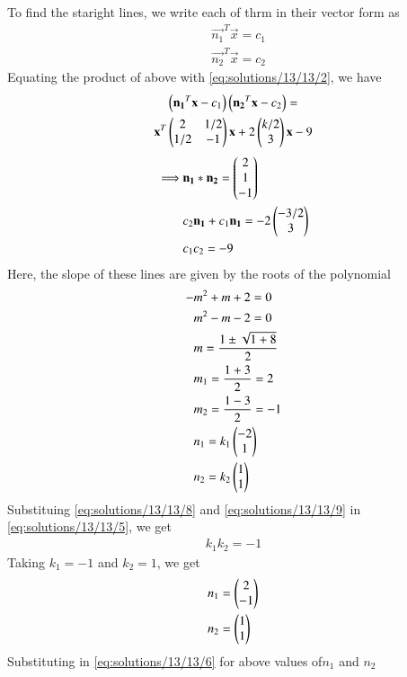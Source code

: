 To find the staright lines, we write each of thrm in their vector form as
\begin{align}
	& \vec{n_1}^T\vec{x} =c_1 \\
	& \vec{n_2}^T\vec{x} =c_2 
\end{align} 
Equating the product of above with \eqref{eq:solutions/13/13/2}, we have
\begin{multline}
 \left(\mathbf{n_1}^T\mathbf{x}-c_1\right)\left(\mathbf{n_2}^T\mathbf{x}-c_2\right) = \\ 
\mathbf{x}^T\begin{pmatrix}2 & 1/2 \\ 1/2 & -1\end{pmatrix}\mathbf{x}+2\begin{pmatrix}k/2 \\ 3\end{pmatrix}\mathbf{x}-9
\end{multline}
\begin{align}
\implies & \mathbf{n_1}*\mathbf{n_2} = \begin{pmatrix}2 \\ 1 \\ -1\end{pmatrix}\label{eq:solutions/13/13/5} \\
& c_2\mathbf{n_1} + c_1\mathbf{n_1} =-2\begin{pmatrix}-3/2 \\ 3\end{pmatrix}\label{eq:solutions/13/13/6} \\
& c_1c_2 = -9 \label{eq:solutions/13/13/7}
\end{align}
Here, the slope of these lines are given by the roots of the polynomial
\begin{align}
-& m^2 + m + 2 = 0 \\ 
 & m^2 - m - 2 = 0 \\
 & m = \frac{1 \pm \sqrt{1+8}}{2} \\
 & m_1 = \frac{1+3}{2} = 2 \\
 & m_2 = \frac{1-3}{2} = -1 \\
 & n_1 = k_1\begin{pmatrix}-2 \\ 1\end{pmatrix}\label{eq:solutions/13/13/8} \\
 & n_2 = k_2\begin{pmatrix}1 \\ 1\end{pmatrix}\label{eq:solutions/13/13/9}
\end{align}
Substituing \eqref{eq:solutions/13/13/8} and \eqref{eq:solutions/13/13/9} in \eqref{eq:solutions/13/13/5}, we get
\begin{align}
	k_1k_2 = -1
\end{align}
Taking $k_1=-1$ and $k_2=1$, we get
\begin{align}
	& n_1 = \begin{pmatrix}2 \\ -1\end{pmatrix} \\
	& n_2 = \begin{pmatrix}1 \\ 1\end{pmatrix}
\end{align}
Substituting in \eqref{eq:solutions/13/13/6} for  above values of$n_1$ and $n_2$
